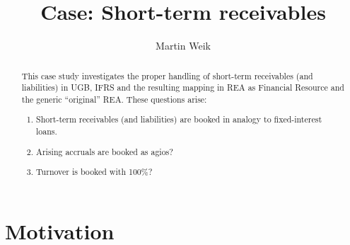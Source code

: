 \documentclass[10pt,paper=a4,parskip]{scrartcl}
\author{Martin Weik}
\title{Case: Short-term receivables}
\begin{document}
\maketitle
\begin{abstract}
This case study investigates the proper handling of short-term receivables (and liabilities) in UGB, IFRS and the resulting mapping in REA as Financial Resource and the generic ``original'' REA.
These questions arise:
\begin{enumerate}
	\item Short-term receivables (and liabilities) are booked in analogy to fixed-interest loans.
	\item Arising accruals are booked as agios?
	\item Turnover is booked with 100\%?
\end{enumerate}
\end{abstract}

\section{Motivation}



\end{document}
